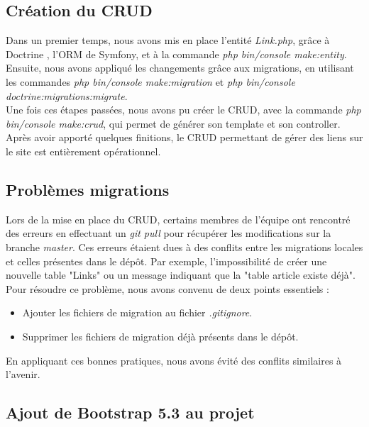 \documentclass[12pt,a4paper]{article}
\begin{document}
\newpage
	\subsection{Création du CRUD}
	
	Dans un premier temps, nous avons mis en place l'entité \textit{Link.php}, grâce à Doctrine \cite{doctrine}, l'ORM de Symfony, et à la commande \textit{php bin/console make:entity}. Ensuite, nous avons appliqué les changements grâce aux migrations, en utilisant les commandes \textit{php bin/console make:migration} et \textit{php bin/console doctrine:migrations:migrate}. \\
	Une fois ces étapes passées, nous avons pu créer le CRUD, avec la commande \textit{php bin/console make:crud}, qui permet de générer son template et son controller. \\ 
	Après avoir apporté quelques finitions, le CRUD permettant de gérer des liens sur le site est entièrement opérationnel.
	
	\subsection{Problèmes migrations}

	Lors de la mise en place du CRUD, certains membres de l'équipe ont rencontré des erreurs en effectuant un \textit{git pull} pour récupérer les modifications sur la branche \textit{master}. Ces erreurs étaient dues à des conflits entre les migrations locales et celles présentes dans le dépôt. Par exemple, l'impossibilité de créer une nouvelle table "Links" ou un message indiquant que la "table article existe déjà". \\

	Pour résoudre ce problème, nous avons convenu de deux points essentiels : \\
	\begin{itemize}
		\item Ajouter les fichiers de migration au fichier \textit{.gitignore}.
		\item Supprimer les fichiers de migration déjà présents dans le dépôt. \\
	\end{itemize} 

	En appliquant ces bonnes pratiques, nous avons évité des conflits similaires à l'avenir.

	\subsection{Ajout de Bootstrap 5.3 au projet}
	
\end{document}
